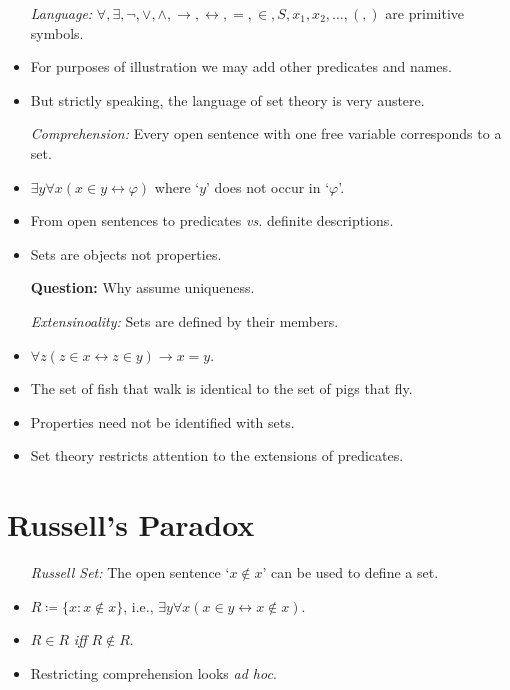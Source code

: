 \documentclass[a4paper, 11pt]{article} %
\newcommand{\set}[1]{\lbrace#1\rbrace} %
\begin{document}
  \begin{itemize}
    \item[\it Language:] $\forall, \exists, \neg, \vee, \wedge, \rightarrow, \leftrightarrow, =, \in, S, x_1, x_2,\ldots, (,)$ are primitive symbols. 
      \item For purposes of illustration we may add other predicates and names.
      \item But strictly speaking, the language of set theory is very austere.
    \item[\it Comprehension:] Every open sentence with one free variable corresponds to a set.
      \item $\exists y\forall x(x \in y \leftrightarrow \varphi)$ where `$y$' does not occur in `$\varphi$'.
      \item From open sentences to predicates \textit{vs.} definite descriptions.
      \item Sets are objects not properties.
      \item[\bf Question:] Why assume uniqueness.
    \item[\it Extensinoality:] Sets are defined by their members.
      \item $\forall z(z \in x \leftrightarrow z \in y) \rightarrow x = y$.
      \item The set of fish that walk is identical to the set of pigs that fly.
      \item Properties need not be identified with sets.
      \item Set theory restricts attention to the extensions of predicates.
  \end{itemize}




\section*{Russell's Paradox}

  \begin{itemize}
    \item[\it Russell Set:] The open sentence `$x \notin x$' can be used to define a set.
      \item $R\coloneq\set{x : x \notin x}$, i.e., $\exists y\forall x(x \in y \leftrightarrow x \notin x)$.
      \item $R \in R$ \textit{iff} $R \notin R$. 
      \item Restricting comprehension looks \textit{ad hoc}.
  \end{itemize}
\end{document}
